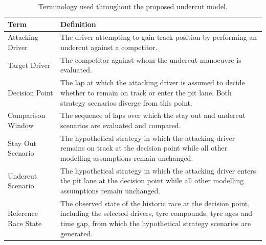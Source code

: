 \begin{table}[htbp]
\centering
\caption{Terminology used throughout the proposed undercut model.}
\label{tab:model_terminology}

\begin{tabular}{|P{0.22\textwidth}|P{0.73\textwidth}|}
\hline
\textbf{Term} & \textbf{Definition} \\
\hline

Attacking Driver &
The driver attempting to gain track position by performing an undercut against a competitor. \\
\hline

Target Driver &
The competitor against whom the undercut manoeuvre is evaluated. \\
\hline

Decision Point &
The lap at which the attacking driver is assumed to decide whether to remain on track or enter the pit lane. Both strategy scenarios diverge from this point. \\
\hline

Comparison Window &
The sequence of laps over which the stay out and undercut scenarios are evaluated and compared. \\
\hline

Stay Out Scenario &
The hypothetical strategy in which the attacking driver remains on track at the decision point while all other modelling assumptions remain unchanged. \\
\hline

Undercut Scenario &
The hypothetical strategy in which the attacking driver enters the pit lane at the decision point while all other modelling assumptions remain unchanged. \\
\hline

Reference Race State &
The observed state of the historic race at the decision point, including the selected drivers, tyre compounds, tyre ages and time gap, from which the hypothetical strategy scenarios are generated. \\
\hline

\end{tabular}
\end{table}